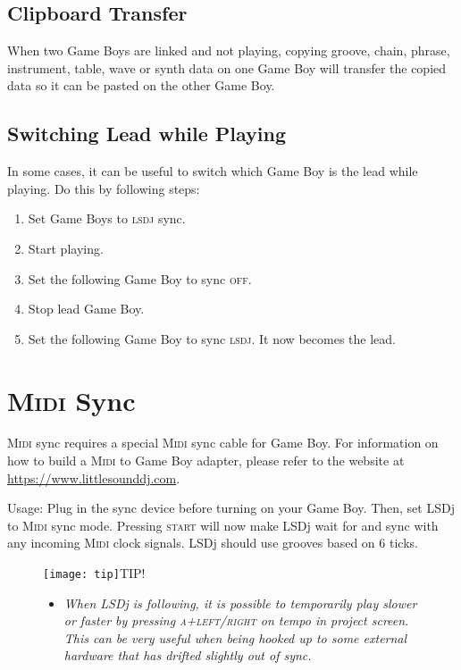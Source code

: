 \subsection{Clipboard Transfer}

When two Game Boys are linked and not playing, copying groove, chain, phrase, instrument, table, wave or synth data on one Game Boy will transfer the copied data so it can be pasted on the other Game Boy.

\subsection{Switching Lead while Playing}

In some cases, it can be useful to switch which Game Boy is the lead while playing. Do this by following steps:

\begin{enumerate}
    \item Set Game Boys to \textsc{lsdj} sync.
    \item Start playing.
    \item Set the following Game Boy to sync \textsc{off}.
    \item Stop lead Game Boy.
    \item Set the following Game Boy to sync \textsc{lsdj}. It now becomes the lead.
\end{enumerate}

\section{\textsc{Midi} Sync}

\textsc{Midi} sync requires a special \textsc{Midi} sync cable for Game Boy. For information on how to build a \textsc{Midi} to Game Boy adapter, please refer to the website at \url{https://www.littlesounddj.com}.

Usage: Plug in the sync device before turning on your Game Boy. Then, set LSDj to \textsc{Midi} sync mode. Pressing \textsc{start} will now make LSDj wait for and sync with any incoming \textsc{Midi} clock signals. LSDj should use grooves based on 6 ticks.

\begin{figure}[hbtp]
\texttt{[image: tip]}TIP!
\begin{itemize}
        \item \textit{When LSDj is following, it is possible to temporarily play
slower or faster by pressing \textsc{a+left/right} on tempo in project screen. This can
be very useful when being hooked up to some external hardware that has drifted slightly out
of sync.}
	\end{itemize}
\end{figure}


